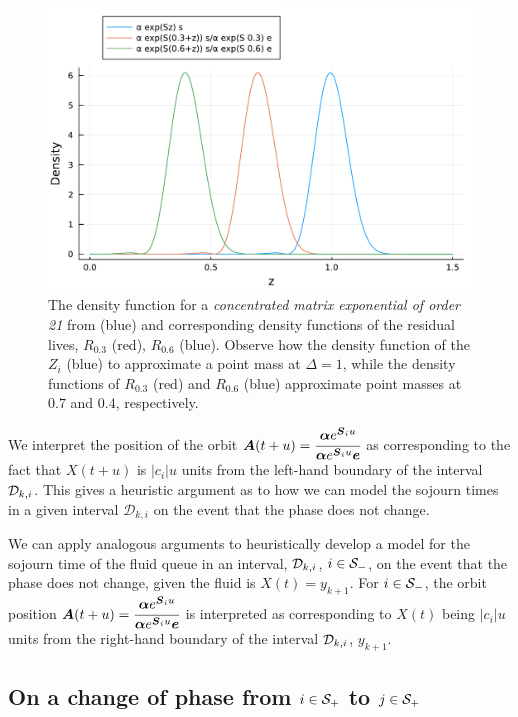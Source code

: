\begin{figure}
\centering
\includegraphics[width=\textwidth]{chapter2/figs/ME_residual_life_density.pdf}
\caption{The density function for a \emph{concentrated matrix exponential of order 21} from \citep{hht2020} (blue) and corresponding density functions of the residual lives, \(R_{0.3}\) (red), \(R_{0.6}\) (blue). Observe how the density function of the \(Z_i\) (blue) to approximate a point mass at \(\Delta=1\), while the density functions of \(R_{0.3}\) (red) and \(R_{0.6}\) (blue) approximate point masses at \(0.7\) and \(0.4\), respectively. }
\label{fig:residual distributions}
\end{figure}

We interpret the position of the orbit \(\boldsymbol A(t+u) = \cfrac{\boldsymbol\alpha e^{\boldsymbol S_iu } }{\boldsymbol\alpha e^{\boldsymbol S_iu } \boldsymbol e}\) as corresponding to the fact that \(X(t+u)\) is \(|c_i|u\) units from the left-hand boundary of the interval \(\mathcal{D}_{k,i}\). This gives a heuristic argument as to how we can model the sojourn times in a given interval \(\mathcal D_{k,i}\) on the event that the phase does not change. 

We can apply analogous arguments to heuristically develop a model for the sojourn time of the fluid queue in an interval, \(\mathcal{D}_{k,i}\), \(i\in\mathcal{S}_-\), on the event that the phase does not change, given the fluid is \(X(t)=y_{k+1}\). For \(i\in\mathcal{S}_-\), the orbit position \(\boldsymbol A(t+u) = \cfrac{\boldsymbol\alpha e^{\boldsymbol S_iu } }{\boldsymbol\alpha e^{\boldsymbol S_iu } \boldsymbol e}\) is interpreted as corresponding to \(X(t)\) being \(|c_i|u\) units from the right-hand boundary of the interval \(\mathcal{D}_{k,i}\), \(y_{k+1}\). 

\subsection{On a change of phase from \(i\in\mathcal{S}_+\) to \(j\in\mathcal{S}_+\)} 

